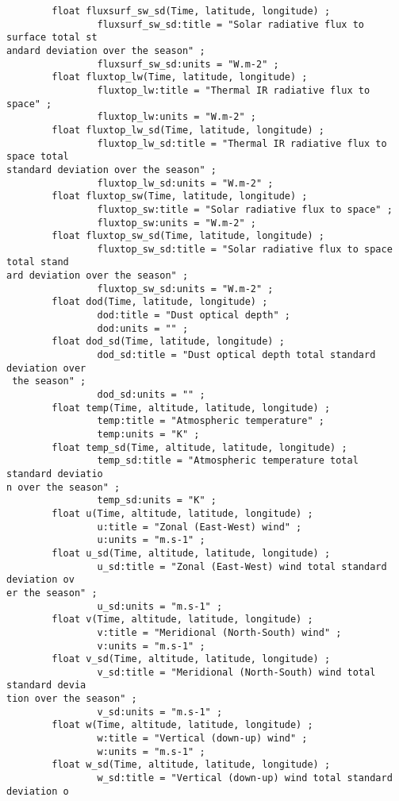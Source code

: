 {\begin{verbatim}
        float fluxsurf_sw_sd(Time, latitude, longitude) ;
                fluxsurf_sw_sd:title = "Solar radiative flux to surface total st
andard deviation over the season" ;
                fluxsurf_sw_sd:units = "W.m-2" ;
        float fluxtop_lw(Time, latitude, longitude) ;
                fluxtop_lw:title = "Thermal IR radiative flux to space" ;
                fluxtop_lw:units = "W.m-2" ;
        float fluxtop_lw_sd(Time, latitude, longitude) ;
                fluxtop_lw_sd:title = "Thermal IR radiative flux to space total 
standard deviation over the season" ;
                fluxtop_lw_sd:units = "W.m-2" ;
        float fluxtop_sw(Time, latitude, longitude) ;
                fluxtop_sw:title = "Solar radiative flux to space" ;
                fluxtop_sw:units = "W.m-2" ;
        float fluxtop_sw_sd(Time, latitude, longitude) ;
                fluxtop_sw_sd:title = "Solar radiative flux to space total stand
ard deviation over the season" ;
                fluxtop_sw_sd:units = "W.m-2" ;
        float dod(Time, latitude, longitude) ;
                dod:title = "Dust optical depth" ;
                dod:units = "" ;
        float dod_sd(Time, latitude, longitude) ;
                dod_sd:title = "Dust optical depth total standard deviation over
 the season" ;
                dod_sd:units = "" ;
        float temp(Time, altitude, latitude, longitude) ;
                temp:title = "Atmospheric temperature" ;
                temp:units = "K" ;
        float temp_sd(Time, altitude, latitude, longitude) ;
                temp_sd:title = "Atmospheric temperature total standard deviatio
n over the season" ;
                temp_sd:units = "K" ;
        float u(Time, altitude, latitude, longitude) ;
                u:title = "Zonal (East-West) wind" ;
                u:units = "m.s-1" ;
        float u_sd(Time, altitude, latitude, longitude) ;
                u_sd:title = "Zonal (East-West) wind total standard deviation ov
er the season" ;
                u_sd:units = "m.s-1" ;
        float v(Time, altitude, latitude, longitude) ;
                v:title = "Meridional (North-South) wind" ;
                v:units = "m.s-1" ;
        float v_sd(Time, altitude, latitude, longitude) ;
                v_sd:title = "Meridional (North-South) wind total standard devia
tion over the season" ;
                v_sd:units = "m.s-1" ;
        float w(Time, altitude, latitude, longitude) ;
                w:title = "Vertical (down-up) wind" ;
                w:units = "m.s-1" ;
        float w_sd(Time, altitude, latitude, longitude) ;
                w_sd:title = "Vertical (down-up) wind total standard deviation o

\end{verbatim}}

